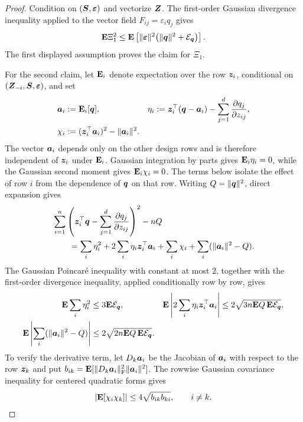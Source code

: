 \documentclass{article}
\theoremstyle{plain} %
\theoremstyle{definition} %
\theoremstyle{definition} %
\begin{document}
\begin{proof}
Condition on $(\boldsymbol{S},{\boldsymbol{\varepsilon} })$ and vectorize $\boldsymbol{Z}$.  The first-order Gaussian
divergence inequality applied to the vector field
$F_{ij}=\varepsilon_iq_j$ gives
\begin{align*}
    {\mathbf{E}}\Xi_1^2
    \leq {\mathbf{E}}\left[\lVert{\boldsymbol{\varepsilon} }\rVert^2
       \bigl(\lVert\boldsymbol{q}\rVert^2+{\mathcal E}_{\boldsymbol{q}}\bigr)\right].
\end{align*}
The first displayed assumption proves the claim for $\Xi_1$.

For the second claim, let ${\mathbf{E}}_i$ denote expectation over the row $\boldsymbol{z}_i$,
conditional on $(\boldsymbol{Z}_{-i},\boldsymbol{S},{\boldsymbol{\varepsilon} })$, and set
\begin{align*}
    \boldsymbol{a}_i&:={\mathbf{E}}_i[\boldsymbol{q}],
    & \eta_i&:=\boldsymbol{z}_i^\top(\boldsymbol{q}-\boldsymbol{a}_i)
       -\sum_{j=1}^d\pdv{q_j}{z_{ij}},\\
    \chi_i&:=(\boldsymbol{z}_i^\top\boldsymbol{a}_i)^2-\lVert\boldsymbol{a}_i\rVert^2.
\end{align*}
The vector $\boldsymbol{a}_i$ depends only on the other design rows and is
therefore independent of $\boldsymbol{z}_i$ under ${\mathbf{E}}_i$. Gaussian integration by
parts gives ${\mathbf{E}}_i\eta_i=0$, while the Gaussian second moment gives
${\mathbf{E}}_i\chi_i=0$. The terms below isolate the effect of row $i$ from
the dependence of $\boldsymbol{q}$ on that row.
Writing $Q=\lVert\boldsymbol{q}\rVert^2$, direct expansion gives
\begin{align*}
    &\sum_{i=1}^n\left(
       \boldsymbol{z}_i^\top\boldsymbol{q}-\sum_{j=1}^d\pdv{q_j}{z_{ij}}
    \right)^2-nQ\\
    &\qquad=\sum_i\eta_i^2
       +2\sum_i\eta_i\boldsymbol{z}_i^\top\boldsymbol{a}_i
       +\sum_i\chi_i
       +\sum_i(\lVert\boldsymbol{a}_i\rVert^2-Q).
\end{align*}
The Gaussian Poincar\'e inequality with constant at most $2$, together with the
first-order divergence inequality, applied conditionally row by row, gives
\begin{align*}
    {\mathbf{E}}\sum_i\eta_i^2
       &\leq3{\mathbf{E}}{\mathcal E}_{\boldsymbol{q}},
    &
    {\mathbf{E}}\left|2\sum_i\eta_i\boldsymbol{z}_i^\top\boldsymbol{a}_i\right|
       &\leq2\sqrt{3n{\mathbf{E}} Q\,{\mathbf{E}}{\mathcal E}_{\boldsymbol{q}}},
    \\
    {\mathbf{E}}\left|\sum_i(\lVert\boldsymbol{a}_i\rVert^2-Q)\right|
       &\leq2\sqrt{2n{\mathbf{E}} Q\,{\mathbf{E}}{\mathcal E}_{\boldsymbol{q}}}.
\end{align*}
To verify the derivative term, let $D_k\boldsymbol{a}_i$ be the Jacobian of $\boldsymbol{a}_i$ with respect
to the row $\boldsymbol{z}_k$ and put
$b_{ik}={\mathbf{E}}[\lVert D_k\boldsymbol{a}_i\rVert_{\rm F}^2\lVert\boldsymbol{a}_i\rVert^2]$.
The rowwise Gaussian covariance inequality for centered quadratic forms gives
\begin{align*}
    |{\mathbf{E}}[\chi_i\chi_k]|
       \leq4\sqrt{b_{ik}b_{ki}},\qquad i\ne k.
\end{align*}

\end{proof}
\end{document}
